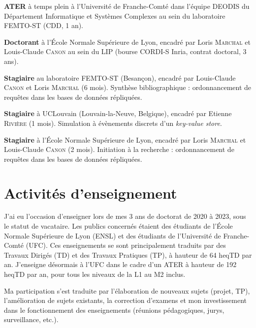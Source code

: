 \documentclass[12pt]{article}
\newcommand{\cvitem}[2]{\item[#1] #2}
\newcounter{cvitems}
\begin{document}
\begin{cvitems}
	\cvitem{2023--2024}{\textbf{ATER} à temps plein à l'Université de Franche-Comté dans l'équipe
	DEODIS du Département Informatique et Systèmes Complexes au sein du laboratoire FEMTO-ST (CDD, 1
	an).}

	\cvitem{2020--2023}{\textbf{Doctorant} à l'École Normale Supérieure de Lyon, encadré par Loris
	\textsc{Marchal} et Louis-Claude \textsc{Canon} au sein du LIP (bourse CORDI-S Inria, contrat
	doctoral, 3 ans).}

	\cvitem{2020}{\textbf{Stagiaire} au laboratoire FEMTO-ST (Besançon), encadré par Louis-Claude
	\textsc{Canon} et Loris \textsc{Marchal} (6 mois).  
	Synthèse bibliographique : ordonnancement de requêtes dans les bases de données répliquées.}

	\cvitem{2019}{\textbf{Stagiaire} à UCLouvain (Louvain-la-Neuve, Belgique), encadré par Etienne
	\textsc{Rivière} (1 mois).  
	Simulation à évènements discrets d'un \emph{key-value store}.}

	\cvitem{2019}{\textbf{Stagiaire} à l'École Normale Supérieure de Lyon, encadré par Loris
	\textsc{Marchal} et Louis-Claude \textsc{Canon} (2 mois).  
	Initiation à la recherche : ordonnancement de requêtes dans les bases de données répliquées.}
\end{cvitems}

\section{Activités d'enseignement}

J'ai eu l'occasion d'enseigner lors de mes 3 ans de doctorat de 2020 à 2023, sous le statut de
vacataire.  
Les publics concernés étaient des étudiants de l'École Normale Supérieure de Lyon (ENSL) et des
étudiants de l'Université de Franche-Comté (UFC).  
Ces enseignements se sont principalement traduits par des Travaux Dirigés (TD) et des Travaux
Pratiques (TP), à hauteur de 64 heqTD par an.  
J'enseigne désormais à l'UFC dans le cadre d'un ATER à hauteur de 192 heqTD par an, pour tous les
niveaux de la L1 au M2 inclus.

Ma participation s'est traduite par l'élaboration de nouveaux sujets (projet, TP), l'amélioration de
sujets existants, la correction d'examens et mon investissement dans le fonctionnement des
enseignements (réunions pédagogiques, jurys, surveillance, etc.).
\end{document}
